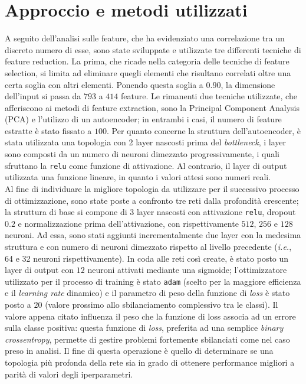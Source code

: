 \section{Approccio e metodi utilizzati}
A seguito dell'analisi sulle feature, che ha evidenziato una correlazione tra un discreto numero di esse, sono state sviluppate e utilizzate tre differenti tecniche di feature reduction. 
La prima, che ricade nella categoria delle tecniche di feature selection, si limita ad eliminare quegli elementi che risultano correlati oltre una certa soglia con altri elementi. 
Ponendo questa soglia a $0.90$, la dimensione dell'input si passa da $793$ a $414$ feature.
Le rimanenti due tecniche utilizzate, che afferiscono ai metodi di feature extraction, sono la Principal Component Analysis (PCA) e l'utilizzo di un autoencoder; in entrambi i casi, il numero di feature estratte è stato fissato a $100$.
Per quanto concerne la struttura dell'autoencoder, è stata utilizzata una topologia con 2 layer nascosti prima del \textit{bottleneck}, i layer sono composti da un numero di neuroni dimezzato progressivamente, i quali sfruttano la \texttt{relu} come funzione di attivazione. 
Al contrario, il layer di output utilizzata una funzione lineare, in quanto i valori attesi sono numeri reali.\\
Al fine di individuare la migliore topologia da utilizzare per il successivo processo di ottimizzazione, sono state poste a confronto tre reti dalla profondità crescente; la struttura di base si compone di $3$ layer nascosti con attivazione \texttt{relu}, dropout $0.2$ e normalizzazione prima dell'attivazione, con rispettivamente $512$, $256$ e $128$ neuroni. 
Ad essa, sono stati aggiunti incrementalmente due layer con la medesima struttura e con numero di neuroni dimezzato rispetto al livello precedente (\textit{i.e.}, 64 e 32 neuroni rispettivamente). 
In coda alle reti così create, è stato posto un layer di output con $12$ neuroni attivati mediante una sigmoide; l'ottimizzatore utilizzato per il processo di training è stato \texttt{adam} (scelto per la maggiore efficienza e il \textit{learning rate} dinamico) e il parametro di peso della funzione di \textit{loss} è stato posto a $20$ (valore prossimo allo sbilanciamento complessivo tra le classi). Il valore appena citato influenza il peso che la funzione di loss associa ad un errore sulla classe positiva: questa funzione di \textit{loss}, preferita ad una semplice \textit{binary crossentropy}, permette di gestire problemi fortemente sbilanciati come nel caso preso in analisi.
Il fine di questa operazione è quello di determinare se una topologia più profonda della rete  sia in grado di ottenere performance migliori a parità di valori degli iperparametri.


